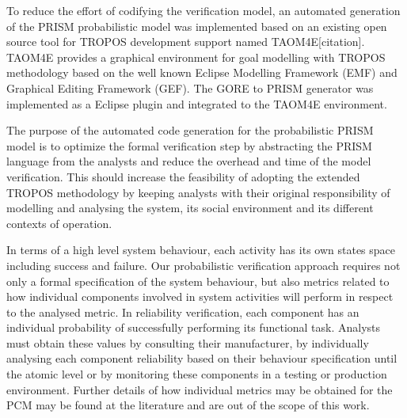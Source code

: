 To reduce the effort of codifying the verification model, an automated generation of the PRISM probabilistic model was implemented based on an existing open source tool for TROPOS development support named TAOM4E[citation]. TAOM4E provides a graphical environment for goal modelling with TROPOS methodology based on the well known Eclipse Modelling Framework (EMF) and Graphical Editing Framework (GEF). The GORE to PRISM generator was implemented as a Eclipse plugin and integrated to the TAOM4E environment. 

The purpose  of the automated code generation for the probabilistic PRISM model is to optimize the formal verification step by abstracting the PRISM language from the analysts and reduce the overhead and time of the model verification. This should increase the feasibility of adopting the extended TROPOS methodology by keeping analysts with their original responsibility of modelling and analysing the system, its social environment and its different contexts of operation.






In terms of a high level system behaviour, each activity has its own states space including success and failure. Our probabilistic verification approach requires not only a formal specification of the system behaviour, but also metrics related to how individual components involved in system activities will perform in respect to the analysed metric. In reliability verification, each component has an individual probability of successfully performing its functional task. Analysts must obtain these values by consulting their manufacturer, by individually analysing each component reliability based on their behaviour specification until the atomic level or by monitoring these components in a testing or production environment. Further details of how individual metrics may be obtained for the PCM may be found at the literature and are out of the scope of this work.
